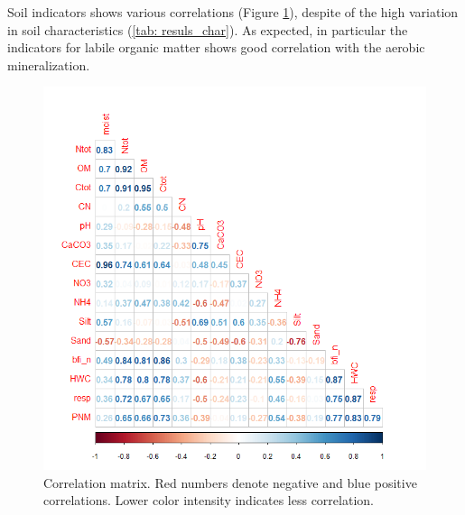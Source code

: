 \documentclass[10pt,twoside,dutch,english]{report}
\begin{document}
Soil indicators shows various correlations (Figure \ref{fig:results_corr}), despite of the high variation in soil characteristics (\ref{tab: resuls_char}). As expected, in particular the indicators for labile organic matter shows good correlation with the aerobic mineralization. 
	\begin{figure}[h] %
	\centering
	\includegraphics[width=0.7\linewidth]{results_corr}
	\caption{Correlation matrix. Red numbers denote negative and blue positive correlations. Lower color intensity indicates less correlation.}
	\label{fig:results_corr}
\end{figure}
\end{document}
